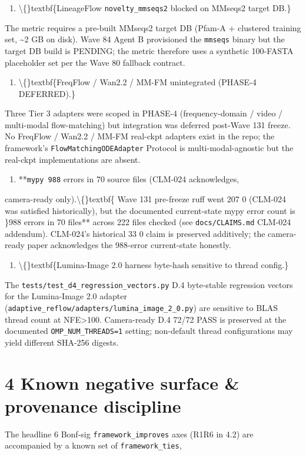 \documentclass[preprint,3p,times,twocolumn]{elsarticle}
\begin{document}
\begin{enumerate}
\item \textbackslash\{\}textbf\{LineageFlow \texttt{novelty\_mmseqs2} blocked on MMseqs2 target DB.\}
\end{enumerate}
The metric requires a pre-built MMseqs2 target DB (Pfam-A + clustered training set, \textasciitilde{}2 GB on disk). Wave 84 Agent B provisioned the \texttt{mmseqs} binary but the target DB build is PENDING; the metric therefore uses a synthetic 100-FASTA placeholder set per the Wave 80 fallback contract.

\begin{enumerate}
\item \textbackslash\{\}textbf\{FreqFlow / Wan2.2 / MM-FM unintegrated (PHASE-4 DEFERRED).\}
\end{enumerate}
Three Tier 3 adapters were scoped in PHASE-4 (frequency-domain / video / multi-modal flow-matching) but integration was deferred post-Wave 131 freeze. No FreqFlow / Wan2.2 / MM-FM real-ckpt adapters exist in the repo; the framework's \texttt{FlowMatchingODEAdapter} Protocol is multi-modal-agnostic but the real-ckpt implementations are absent.

\begin{enumerate}
\item **\texttt{mypy 988} errors in 70 source files (CLM-024 acknowledges,
\end{enumerate}
camera-ready only).\textbackslash\{\}textbf\{ Wave 131 pre-freeze ruff went 207  0 (CLM-024 was satisfied historically), but the documented current-state mypy error count is \}988 errors in 70 files** across 222 files checked (see \texttt{docs/CLAIMS.md} CLM-024 addendum). CLM-024's historical 33  0 claim is preserved additively; the camera-ready paper acknowledges the 988-error current-state honestly.

\begin{enumerate}
\item \textbackslash\{\}textbf\{Lumina-Image 2.0 harness byte-hash sensitive to thread config.\}
\end{enumerate}
The \texttt{tests/test\_d4\_regression\_vectors.py} D.4 byte-stable regression vectors for the Lumina-Image 2.0 adapter (\texttt{adaptive\_reflow/adapters/lumina\_image\_2\_0.py}) are sensitive to BLAS thread count at NFE>100. Camera-ready D.4 72/72 PASS is preserved at the documented \texttt{OMP\_NUM\_THREADS=1} setting; non-default thread configurations may yield different SHA-256 digests.

\section{4 Known negative surface \& provenance discipline}
The headline 6 Bonf-sig \texttt{framework\_improves} axes (R1R6 in 4.2) are accompanied by a known set of \texttt{framework\_ties},
\end{document}
